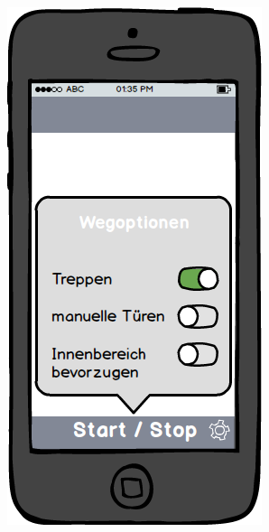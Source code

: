 \begin{figure}[h]
\begin{minipage}{.5\textwidth}
  \includegraphics[width=.8\linewidth]{img/wegoptionen-mockup.png}
  \label{img:wegoptionen-mockup}
\end{minipage}
\end{figure}